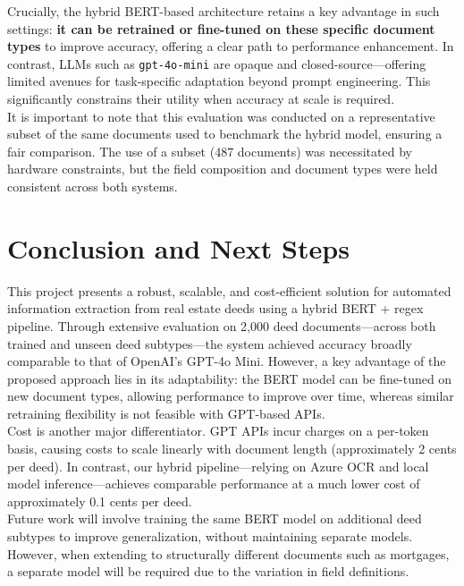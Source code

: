 \documentclass{article}
\begin{document}
Crucially, the hybrid BERT-based architecture retains a key advantage in such settings: \textbf{it can be retrained or fine-tuned on these specific document types} to improve accuracy, offering a clear path to performance enhancement. In contrast, LLMs such as \texttt{gpt-4o-mini} are opaque and closed-source—offering limited avenues for task-specific adaptation beyond prompt engineering. This significantly constrains their utility when accuracy at scale is required. \\

It is important to note that this evaluation was conducted on a representative subset of the same documents used to benchmark the hybrid model, ensuring a fair comparison. The use of a subset (487 documents) was necessitated by hardware constraints, but the field composition and document types were held consistent across both systems.

\section{Conclusion and Next Steps}

This project presents a robust, scalable, and cost-efficient solution for automated information extraction from real estate deeds using a hybrid BERT + regex pipeline. Through extensive evaluation on 2,000 deed documents—across both trained and unseen deed subtypes—the system achieved accuracy broadly comparable to that of OpenAI’s GPT-4o Mini. However, a key advantage of the proposed approach lies in its adaptability: the BERT model can be fine-tuned on new document types, allowing performance to improve over time, whereas similar retraining flexibility is not feasible with GPT-based APIs. \\

Cost is another major differentiator. GPT APIs incur charges on a per-token basis, causing costs to scale linearly with document length (approximately 2 cents per deed). In contrast, our hybrid pipeline—relying on Azure OCR and local model inference—achieves comparable performance at a much lower cost of approximately 0.1 cents per deed. \\

Future work will involve training the same BERT model on additional deed subtypes to improve generalization, without maintaining separate models. However, when extending to structurally different documents such as mortgages, a separate model will be required due to the variation in field definitions. \\
\end{document}
